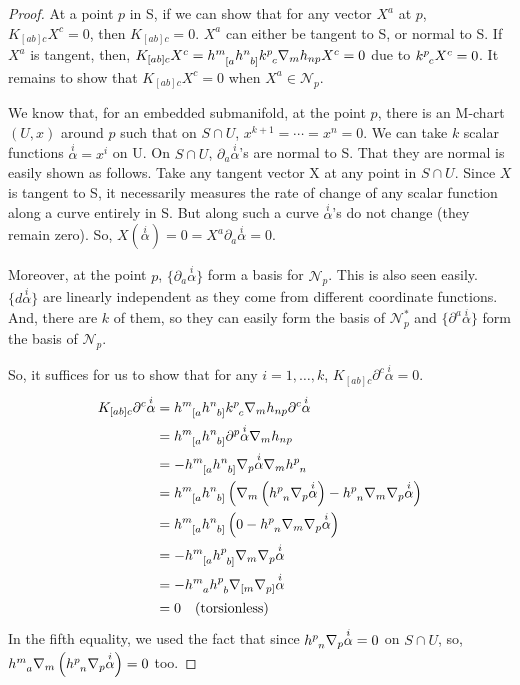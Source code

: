 \begin{proof}
At a point $p$ in S, if we can show that for any vector $X^a$ at $p$, $K_{[ab]c} X^c = 0$, then $K_{[ab]c} = 0$. $X^a$ can either be tangent to S, or normal to S. If $X^a$ is tangent, then, $K_{[ab]c} X^c = \tt{h}{m}{[a} \tt{h}{n}{b]} \tt{k}{p}{c} \nabla_m h_{np} X^c = 0$ due to $\tt{k}{p}{c} X^c = 0$. It remains to show that $K_{[ab]c} X^c = 0$ when $X^a \in \mathscr{N}_p$.

We know that, for an embedded submanifold, at the point $p$, there is an M-chart $(U, x)$ around $p$ such that on $S \cap U$, $x^{k+1} = \cdots = x^n = 0$. We can take $k$ scalar functions $\overset{i}{\alpha} = x^i$ on U. On $S \cap U$, $\partial_a \overset{i}{\alpha}$'s are normal to S. That they are normal is easily shown as follows. Take any tangent vector X at any point in $S \cap U$. Since $ X$ is tangent to S, it necessarily measures the rate of change of any scalar function along a curve entirely in S. But along such a curve $\overset{i}{\alpha}$'s do not change (they remain zero). So, $X(\overset{i}{\alpha}) = 0 = X^a \partial_a \overset{i}{\alpha} = 0$.

Moreover, at the point $p$, $\{\partial_a \overset{i}{\alpha}\}$ form a basis for $\mathscr{N}_p$. This is also seen easily. $\{d\overset{i}{\alpha}\}$ are linearly independent as they come from different coordinate functions. And, there are $ k$ of them, so they can easily form the basis of $\mathscr{N}^*_p$ and $\{\partial^a \overset{i}{\alpha}\}$ form the basis of $\mathscr{N}_p$.

So, it suffices for us to show that for any $i = 1, \ldots, k$, $K_{[ab]c} \partial^c \overset{i}{\alpha} = 0$.
\begin{align*}
	K_{[ab]c} \partial^c \overset{i}{\alpha} &= \tt{h}{m}{[a} \tt{h}{n}{b]} \tt{k}{p}{c} \nabla_m h_{np} \partial^c \overset{i}{\alpha} \\
	&= \tt{h}{m}{[a} \tt{h}{n}{b]} \partial^p \overset{i}{\alpha} \nabla_m h_{np} \\
	&= - \tt{h}{m}{[a} \tt{h}{n}{b]} \nabla_p \overset{i}{\alpha} \nabla_m \tt{h}{p}{n} \\
	&= \tt{h}{m}{[a} \tt{h}{n}{b]} \lera{\nabla_m \lera{\tt{h}{p}{n} \nabla_p \overset{i}{\alpha}} - \tt{h}{p}{n} \nabla_m \nabla_p \overset{i}{\alpha}} \\
	&= \tt{h}{m}{[a} \tt{h}{n}{b]} \lera{0 - \tt{h}{p}{n} \nabla_m \nabla_p \overset{i}{\alpha}} \\
	&= - \tt{h}{m}{[a} \tt{h}{p}{b]} \nabla_m \nabla_p \overset{i}{\alpha} \\
	&= - \tt{h}{m}{a} \tt{h}{p}{b} \nabla_{[m} \nabla_{p]} \overset{i}{\alpha} \\
	&= 0 \quad \text{(torsionless)}
\end{align*}
In the fifth equality, we used the fact that since $\tt{h}{p}{n} \nabla_p \overset{i}{\alpha} = 0$ on $S \cap U$, so, $\tt{h}{m}{a} \nabla_m \lera{\tt{h}{p}{n} \nabla_p \overset{i}{\alpha}} = 0$ too.
\end{proof}

